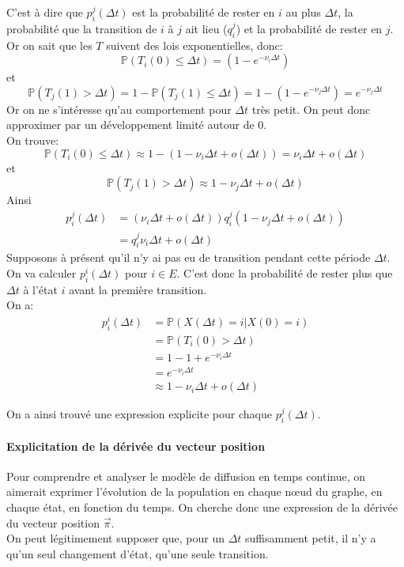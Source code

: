 \documentclass[a4paper]{article}
\theoremstyle{plain}
\theoremstyle{definition}
\theoremstyle{remark}
\begin{document}
C'est à dire que $p_i^j(\Delta t)$ est la probabilité de rester en $i$ au plus $\Delta t$, la probabilité que la transition de $i$ à $j$ ait lieu ($q_i^j$) et la probabilité de rester en $j$.\\
Or on sait que les $T$ suivent des lois exponentielles, donc:
$$
\mathbb{P}(T_i(0)\leqslant\Delta t)=(1-e^{-\nu_i\Delta t})
$$
et
$$\mathbb{P}(T_j(1)>\Delta t)=1-\mathbb{P}(T_j(1)\leqslant\Delta t)=1-(1-e^{-\nu_j\Delta t})=e^{-\nu_j\Delta t}$$
Or on ne s’intéresse qu'au comportement pour $\Delta t$ très petit. On peut donc approximer par un développement limité autour de 0.\\ On trouve:
$$\mathbb{P}(T_i(0)\leqslant\Delta t)\approx1-(1-\nu_i\Delta t+o(\Delta t))=\nu_i\Delta t+o(\Delta t)$$
et 
$$\mathbb{P}(T_j(1)>\Delta t)\approx1-\nu_j\Delta t+o(\Delta t)$$
Ainsi
\begin{align*}
p_i^j(\Delta t)&=(\nu_i\Delta t+o(\Delta t))q_i^j(1-\nu_j\Delta t+o(\Delta t))\\
&=q_i^j\nu_i\Delta t+o(\Delta t)
\end{align*}
Supposons à présent qu'il n'y ai pas eu de transition pendant cette période $\Delta t$. On va calculer $p_i^i(\Delta t)$ pour $i\in E$.
C'est donc la probabilité de rester plus que $\Delta t$ à l'état $i$ avant la première transition.\\
On a:
\begin{align*}
p_i^i(\Delta t)&=\mathbb{P}(X(\Delta t)=i|X(0)=i)\\
&=\mathbb{P}(T_i(0)>\Delta t)\\
&=1-1+e^{-\nu_i\Delta t}\\
&=e^{-\nu_i\Delta t}\\
&\approx 1-\nu_i\Delta t+o(\Delta t)
\end{align*}

On a ainsi trouvé une expression explicite pour chaque $p_i^j(\Delta t)$.
\paragraph{Explicitation de la dérivée du vecteur position}
Pour comprendre et analyser le modèle de diffusion en temps continue, on aimerait exprimer l'évolution de la population en chaque nœud du graphe, en chaque état, en fonction du temps. On cherche donc une expression de la dérivée du vecteur position $\vec{\pi}$.\\
On peut légitimement supposer que, pour un $\Delta t$ suffisamment petit, il n'y a qu'un seul changement d'état, qu'une seule transition.
\end{document}
